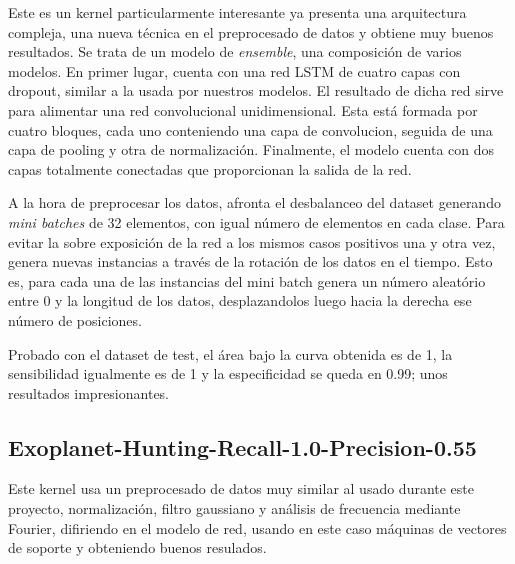 Este es un kernel particularmente interesante ya presenta una arquitectura compleja, una nueva técnica en el preprocesado de datos y obtiene muy buenos resultados. Se trata de un modelo de \textit{ensemble}, una composición de varios modelos. En primer lugar, cuenta con una red LSTM de cuatro capas con dropout, similar a la usada por nuestros modelos. El resultado de dicha red sirve para alimentar una red convolucional unidimensional. Esta está formada por cuatro bloques, cada uno conteniendo una capa de convolucion, seguida de una capa de pooling y otra de normalización. Finalmente, el modelo cuenta con dos capas totalmente conectadas que proporcionan la salida de la red.

A la hora de preprocesar los datos, afronta el desbalanceo del dataset generando \textit{mini batches} de 32 elementos, con igual número de elementos en cada clase. Para evitar la sobre exposición de la red a los mismos casos positivos una y otra vez, genera nuevas instancias a través de la rotación de los datos en el tiempo. Esto es, para cada una de las instancias del mini batch genera un número aleatório entre 0 y la longitud de los datos, desplazandolos luego hacia la derecha ese número de posiciones. 

Probado con el dataset de test, el área bajo la curva obtenida es de 1, la sensibilidad igualmente es de 1 y la especificidad se queda en 0.99; unos resultados impresionantes. 

\subsection{Exoplanet-Hunting-Recall-1.0-Precision-0.55 \cite{Kaggle-kernel-Exoplanet-Hunting}} 

Este kernel usa un preprocesado de datos muy similar al usado durante este proyecto, normalización, filtro gaussiano y análisis de frecuencia mediante Fourier, difiriendo en el modelo de red, usando en este caso máquinas de vectores de soporte y obteniendo buenos resulados.

